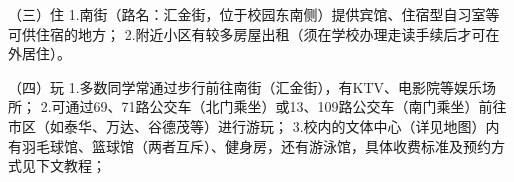 （三）住
1.南街（路名：汇金街，位于校园东南侧）提供宾馆、住宿型自习室等可供住宿的地方；
2.附近小区有较多房屋出租（须在学校办理走读手续后才可在外居住）。

（四）玩
1.多数同学常通过步行前往南街（汇金街），有KTV、电影院等娱乐场所；
2.可通过69、71路公交车（北门乘坐）或13、109路公交车（南门乘坐）前往市区（如泰华、万达、谷德茂等）进行游玩；
3.校内的文体中心（详见地图）内有羽毛球馆、篮球馆（两者互斥）、健身房，还有游泳馆，具体收费标准及预约方式见下文教程；